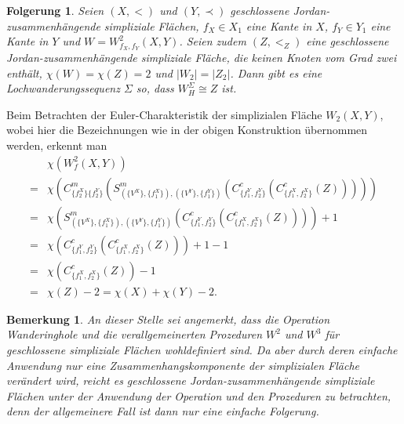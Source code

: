 \documentclass[12pt,titlepage,twoside,cleardoublepage]{article}
\theoremstyle{nummermitklammern}
\newtheorem{folgerung}[temp]{Folgerung}
\newtheorem{bemerkung}[temp]{Bemerkung}
\newtheorem{folgerung}[zahl]{Folgerung}
\newtheorem{bemerkung}[zahl]{Bemerkung}
\numberwithin{equation}{section}
\begin{document}
 \begin{folgerung} 
Seien $(X,<)$ und $(Y, \prec)$ geschlossene Jordan-zusammenhängende simpliziale Flächen, $f_X\in X_1$ eine Kante in $X$, $f_Y \in Y_1$ eine Kante in $Y$ und $W=W_{f_X,f_Y}^2(X,Y)$. Seien zudem $(Z,<_Z)$ eine geschlossene Jordan-zusammenhängende simpliziale Fläche, die keinen Knoten vom Grad zwei enthält, $\chi(W)=\chi(Z)=2$ und $\vert W_2 \vert=\vert Z_2 \vert$. Dann gibt es eine Lochwanderungssequenz $\Sigma$ so, dass $W_H^{\Sigma} \cong Z$ ist. 
\end{folgerung}
Beim Betrachten der Euler-Charakteristik der simplizialen Fläche $W_2(X,Y)$, wobei hier die Bezeichnungen wie in der obigen Konstruktion übernommen werden, erkennt man 
\begin{align*}
&\chi(W^2_f(X,Y))\\
=&\chi(C^m_{\{f_2^X\}\{{f_2^Y}\}}(S^m_{(\{V^X\},\{f_1^X\}),(\{V^Y\},\{f_1^Y\})}(C^c_{\{f_1^Y,f_2^Y\}}(C^c_{\{f_1^X,f_2^X\}}(Z)))))\\
=&\chi(S^m_{(\{V^X\},\{f_1^X\}),(\{V^Y\},\{f_1^Y\})}(C^c_{\{f_1^Y,f_2^Y\}}(C^c_{\{f_1^X,f_2^X\}}(Z))))+1\\
=&\chi(C^c_{\{f_1^Y,f_2^Y\}}(C^c_{\{f_1^X,f_2^X\}}(Z)))+1-1\\
=&\chi(C^c_{\{f_1^X,f_2^X\}}(Z))-1\\
=&\chi(Z)-2=\chi(X)+\chi(Y)-2.
\end{align*}
\begin{bemerkung}
An dieser Stelle sei angemerkt, dass die Operation Wanderinghole und die verallgemeinerten Prozeduren $W^2$ und $W^3$ für geschlossene simpliziale Flächen wohldefiniert sind. Da aber durch deren einfache Anwendung nur eine Zusammenhangskomponente der simplizialen Fläche verändert wird, reicht es geschlossene Jordan-zusammenhängende simpliziale Flächen unter der Anwendung der Operation und den Prozeduren zu betrachten, denn der allgemeinere Fall ist dann nur eine einfache Folgerung.
\end{bemerkung}
\newpage
\end{document}
